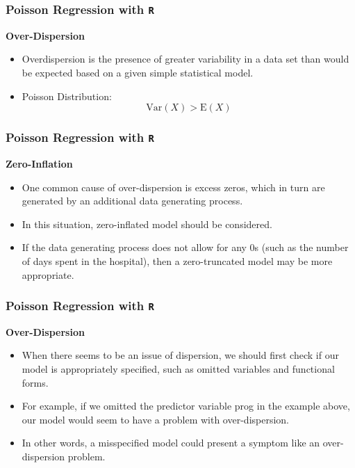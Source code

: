 \documentclass[00-GLMregslides.tex]{subfiles}
\begin{document}
\begin{frame}[fragile]

\frametitle{Poisson Regression with \texttt{R}}
\Large
\textbf{Over-Dispersion}\\ 
\begin{itemize}
\item Overdispersion is the presence of greater variability
 in a data set than would be expected based on a given simple statistical model.
\item Poisson Distribution:
\[ \mathrm{Var}(X) >  \mathrm{E}(X) \]
\end{itemize}
\end{frame}

\begin{frame}[fragile]
	\frametitle{Poisson Regression with \texttt{R}}
	\Large
  \textbf{Zero-Inflation}
	\begin{itemize}
		\item One common cause of over-dispersion is excess zeros, which in turn are generated by an additional data generating 
		process. 
		\item In this situation, zero-inflated model should be considered.
		\item If the data generating process does not allow for any 0s (such as the number of days spent in the hospital), then a zero-truncated model may be more appropriate.
	\end{itemize}
\end{frame}
\begin{frame}[fragile]

\frametitle{Poisson Regression with \texttt{R}}
\Large
\textbf{Over-Dispersion}
\begin{itemize}

 \item When there seems to be an issue of dispersion, we should first check if our model is appropriately specified, 
 such as omitted variables and functional forms. 
 \item For example, if we omitted the predictor variable prog in the example above, our model would seem to have a 
 problem with over-dispersion. 
 \item In other words, a misspecified model could present a symptom like an over-dispersion problem. 
\end{itemize}
\end{frame}
\end{document}
